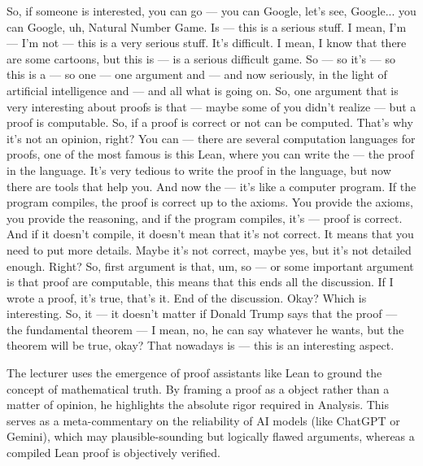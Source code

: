 \begin{spoken-clean}[00:01:56 - 00:04:08]
So, if someone is interested, you can go --- you can Google, let's see, Google... you can Google, uh, Natural Number Game. Is --- this is a serious stuff. I mean, I'm --- I'm not --- this is a very serious stuff. It's difficult. I mean, I know that there are some cartoons, but this is --- is a serious difficult game. So --- so it's --- so this is a --- so one --- one argument and --- and now seriously, in the light of artificial intelligence and --- and all what is going on. So, one argument that is very interesting about proofs is that --- maybe some of you didn't realize --- but a proof is computable. So, if a proof is correct or not can be computed. That's why it's not an opinion, right? You can --- there are several computation languages for proofs, one of the most famous is this Lean, where you can write the --- the proof in the language. It's very tedious to write the proof in the language, but now there are tools that help you. And now the --- it's like a computer program. If the program compiles, the proof is correct up to the axioms. You provide the axioms, you provide the reasoning, and if the program compiles, it's --- proof is correct. And if it doesn't compile, it doesn't mean that it's not correct. It means that you need to put more details. Maybe it's not correct, maybe yes, but it's not detailed enough. Right? So, first argument is that, um, so --- or some important argument is that proof are computable, this means that this ends all the discussion. If I wrote a proof, it's true, that's it. End of the discussion. Okay? Which is interesting. So, it --- it doesn't matter if Donald Trump says that the proof --- the fundamental theorem --- I mean, no, he can say whatever he wants, but the theorem will be true, okay? That nowadays is --- this is an interesting aspect.
\end{spoken-clean}

\begin{didactic-insight}
The lecturer uses the emergence of proof assistants like Lean to ground the concept of mathematical truth. By framing a proof as a  object rather than a matter of opinion, he highlights the absolute rigor required in Analysis. This serves as a meta-commentary on the reliability of AI models (like ChatGPT or Gemini), which may  plausible-sounding but logically flawed arguments, whereas a compiled Lean proof is objectively verified.
\end{didactic-insight}

